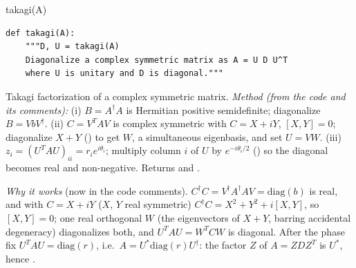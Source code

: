 \begin{function}{takagi(A)}
\begin{Verbatim}
def takagi(A):
    """D, U = takagi(A)
    Diagonalize a complex symmetric matrix as A = U D U^T
    where U is unitary and D is diagonal."""
\end{Verbatim}
Takagi factorization of a complex symmetric matrix. \emph{Method (from the code and its comments):} (i) $B = A^\dagger A$ is Hermitian
positive semidefinite; diagonalize $B = V b V^\dagger$. (ii) $C = V^TAV$ is complex symmetric with $C = X + iY$, $[X, Y] = 0$; diagonalize
$X + Y$ () to get $W$, a simultaneous eigenbasis, and set $U = VW$. (iii) $z_i = (U^TAU)_{ii} = r_ie^{i\theta_i}$; multiply column $i$ of
$U$ by $e^{-i\theta_i/2}$ () so the diagonal becomes real and non-negative. Returns  and .

\emph{Why it works} (now in the code comments). $C^\dagger C=V^\dagger A^\dagger AV=\mathrm{diag}(b)$ is real, and with $C=X+iY$ ($X$, $Y$ real
symmetric) $C^\dagger C=X^2+Y^2+i[X,Y]$, so $[X,Y]=0$; one real orthogonal $W$ (the eigenvectors of $X+Y$, barring accidental degeneracy)
diagonalizes both, and $U^TAU=W^TCW$ is diagonal. After the phase fix $U^TAU=\mathrm{diag}(r)$, i.e.\ $A=U^*\mathrm{diag}(r)U^\dagger$: the
factor $Z$ of $A=ZDZ^T$ is $U^*$, hence .
\end{function}

